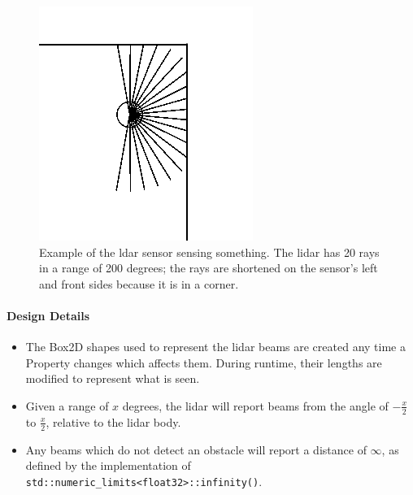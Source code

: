 \begin{itemize}
\begin{figure}[h]
	\centering
	\includegraphics[scale=0.5]{./images_design/lidar_sensor}
	\caption{Example of the ldar sensor sensing something. The lidar has 20 rays in a range of 200 degrees; the rays are shortened on the sensor's left and front sides because it is in a corner.}
	\label{fig:lidarsensorexample}
\end{figure}

\paragraph{Design Details}
\begin{itemize}
\item The Box2D shapes used to represent the lidar beams are created any time a Property changes which affects them. During runtime, their lengths are modified to represent what is seen.
\item Given a range of $x$ degrees, the lidar will report beams from the angle of $-\frac{x}{2}$ to $\frac{x}{2}$, relative to the lidar body.
\item Any beams which do not detect an obstacle will report a distance of $\infty$, as defined by the implementation of \lstinline|std::numeric_limits<float32>::infinity()|.
\end{itemize}


\end{itemize}
